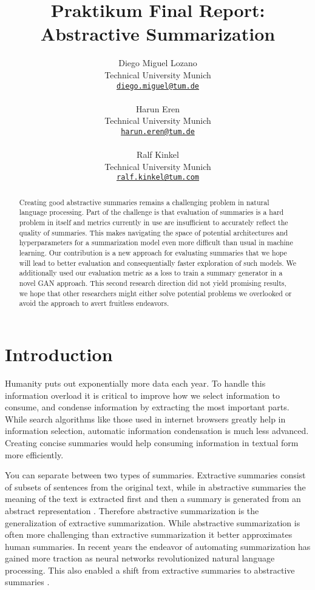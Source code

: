 \documentclass[11pt]{article}
\title{Praktikum Final Report: Abstractive Summarization}
\author{Diego Miguel Lozano  \\
  Technical University Munich \\
  \href{mailto:diego.miguel@tum.de}{\texttt{diego.miguel@tum.de}} \\ \\\And
  Harun Eren \\
  Technical University Munich \\
  \href{mailto:harun.eren@tum.de}{\texttt{harun.eren@tum.de}} \\ \\\And
  Ralf Kinkel \\
  Technical University Munich\\
  \href{mailto:ralf.kinkel@tum.com}{\texttt{ralf.kinkel@tum.com}} \\}
\begin{document}
\maketitle
\begin{abstract}
Creating good abstractive summaries remains a challenging problem in natural language processing. Part of the challenge is that evaluation of summaries is a hard problem in itself and metrics currently in use are insufficient to accurately reflect the quality of summaries. This makes navigating the space of potential architectures and hyperparameters for a summarization model even more difficult than usual in machine learning. Our contribution is a new approach for evaluating summaries that we hope will lead to better evaluation and consequentially faster exploration of such models. 
We additionally used our evaluation metric as a loss to train a summary generator in a novel GAN approach. This second research direction did not yield promising results, we hope that other researchers might either solve potential problems we overlooked or avoid the approach to avert fruitless endeavors. 
\end{abstract}


\section{Introduction}
Humanity puts out exponentially more data each year. To handle this information overload it is critical to improve how we select information to consume, and condense information by extracting the most important parts. While search algorithms like those used in internet browsers greatly help in information selection, automatic information condensation is much less advanced. Creating concise summaries would help consuming information in textual form more efficiently. 

You can separate between two types of summaries. Extractive summaries consist of subsets of sentences from the original text, while in abstractive summaries the meaning of the text is extracted first and then a summary is generated from an abstract representation \cite{lin2019abstractive}. Therefore abstractive summarization is the generalization of extractive summarization. While abstractive summarization is often more challenging than extractive summarization it better approximates human summaries. In recent years the endeavor of automating summarization has gained more traction as neural networks revolutionized natural language processing. This also enabled a shift from extractive summaries to abstractive summaries \cite{lin2019abstractive}.
\end{document}
